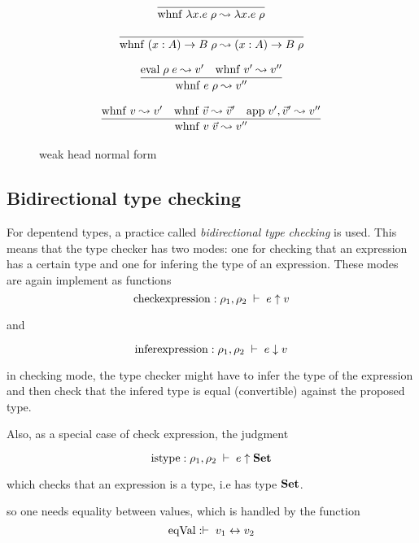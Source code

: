 \begin{figure}
\[
\begin{array}{c}

\infer{\Whnf{\lam x . e \; \rho}{\lam x . e \; \rho}}{}

\end{array}
\]

\[
\begin{array}{c}
\infer{\Whnf{\EPi{x}{A}{B} \; \rho}{\EPi{x}{A}{B} \; \rho}}{}
\end{array}
\]

\[
\begin{array}{c}
\infer{\Whnf{e \; \rho}{v''}}
{\Eval{\rho}{e}{v'}
& \Whnf{v'}{v''} 
}
\end{array}
\]

\[
\begin{array}{c}
\infer{\Whnf{v \; \vec{v}}{v''}}
{
\Whnf{v}{v'}
& \Whnf{\vec{v}}{\vec{v}'}
& {\App{v'}{\vec{v}'}{v''}}
}
\end{array}
\]

\caption{weak head normal form}
\end{figure}

\subsection{Bidirectional type checking} 
For depentend types, a practice called \emph{bidirectional type checking} is used.
This means that the type checker has two modes:
one for checking that an expression has a certain type and one for infering the type of an expression.
These modes are again implement as functions
\[ \mathrm{check expression} :  \Check{\rho_1}{\rho_2}{e}{v}\]

and

\[ \mathrm{infer expression} : \Infer{\rho_1}{\rho_2}{e}{v}\]

in checking mode, the type checker might have to infer the type of the expression and then check that the infered
type is equal (convertible) against the proposed type.

Also, as a special case of check expression, the judgment 

\[ \mathrm{is type} : \IsType{\rho_1}{\rho_2}{e}\]

which checks that an expression is a type, i.e has type $\Set$.

so one needs equality between values, which is handled by the function
\[ \mathrm{eqVal} : \EqVal{v_1}{v_2} \]


